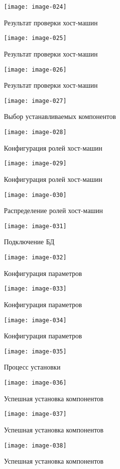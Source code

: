 \newpage

\begin{figure}[ht!]
    \center
    \texttt{[image: image-024]}
    \caption{Результат проверки хост-машин}
    \texttt{[image: image-025]}
    \caption{Результат проверки хост-машин}
\end{figure}

\newpage

\begin{figure}[ht!]
    \center
    \texttt{[image: image-026]}
    \caption{Результат проверки хост-машин}
    \texttt{[image: image-027]}
    \caption{Выбор устанавливаемых компонентов}
\end{figure}

\newpage

\begin{figure}[ht!]
    \center
    \texttt{[image: image-028]}
    \caption{Конфигурация ролей хост-машин}
    \texttt{[image: image-029]}
    \caption{Конфигурация ролей хост-машин}
\end{figure}

\newpage

\begin{figure}[ht!]
    \center
    \texttt{[image: image-030]}
    \caption{Распределение ролей хост-машин}
    \texttt{[image: image-031]}
    \caption{Подключение БД}
    \texttt{[image: image-032]}
    \caption{Конфигурация параметров}
\end{figure}

\newpage

\begin{figure}[ht!]
    \center
    \texttt{[image: image-033]}
    \caption{Конфигурация параметров}
    \texttt{[image: image-034]}
    \caption{Конфигурация параметров}
\end{figure}

\newpage

\begin{figure}[ht!]
    \center
    \texttt{[image: image-035]}
    \caption{Процесс установки}
    \texttt{[image: image-036]}
    \caption{Успешная установка компонентов}
\end{figure}

\newpage

\begin{figure}[ht!]
    \center
    \texttt{[image: image-037]}
    \caption{Успешная установка компонентов}
    \texttt{[image: image-038]}
    \caption{Успешная установка компонентов}
\end{figure}


